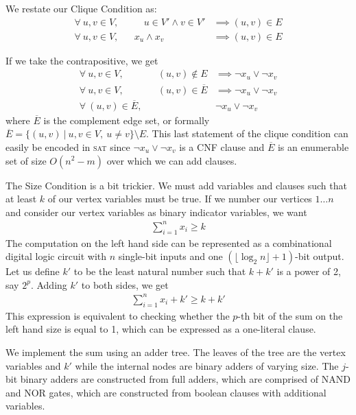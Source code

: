 \documentclass[]{article}
\newcommand{\sat}{\textsc{sat}}
\begin{document}
	We restate our Clique Condition as:
	\begin{align}
	\forall~u,v \in V,&& \quad u \in V' \land v \in V' &\implies (u, v) \in E \\
	\forall~u,v \in V,&& x_u \land x_v &\implies (u, v) \in E
	\end{align}
	
	If we take the contrapositive, we get
	\begin{align}
	\forall~u,v \in V,&& (u, v) \notin E &\implies \lnot x_u \lor \lnot x_v \\
	\forall~u,v \in V,&& (u, v) \in \overline{E} &\implies \lnot x_u \lor \lnot x_v\\
	\forall~ (u, v) \in \overline{E},&& &\lnot x_u \lor \lnot x_v
	\end{align}
	where $\overline{E}$ is the complement edge set, or formally $\overline{E} = \{(u, v) ~\vert~ u, v \in V,~u \neq v\} \setminus E$. This last statement of the clique condition can easily be encoded in \sat{} since $\lnot x_u \lor \lnot x_v$ is a CNF clause and $\overline{E}$ is an enumerable set of size $O(n^2 - m)$ over which we can add clauses.
	
	The Size Condition is a bit trickier. We must add variables and clauses such that at least $k$ of our vertex variables must be true. If we number our vertices $1 \ldots n$ and consider our vertex variables as binary indicator variables, we want
	\begin{align}
	\sum_{i = 1}^{n} x_i \ge k
	\end{align}
	The computation on the left hand side can be represented as a combinational digital logic circuit with $n$ single-bit inputs and one $(\lfloor\log_2 n\rfloor + 1)$-bit output. Let us define $k'$ to be the least natural number such that $k + k'$ is a power of 2, say $2^p$. Adding $k'$ to both sides, we get 
	\begin{align}
	\sum_{i = 1}^{n} x_i + k' \ge k + k'
	\end{align}
	This expression is equivalent to checking whether the $p$-th bit of the sum on the left hand size is equal to 1, which can be expressed as a one-literal clause.
	
	We implement the sum using an adder tree. The leaves of the tree are the vertex variables and $k'$ while the internal nodes are binary adders of varying size. The $j$-bit binary adders are constructed from full adders, which are comprised of NAND and NOR gates, which are constructed from boolean clauses with additional variables.
	
\end{document}
